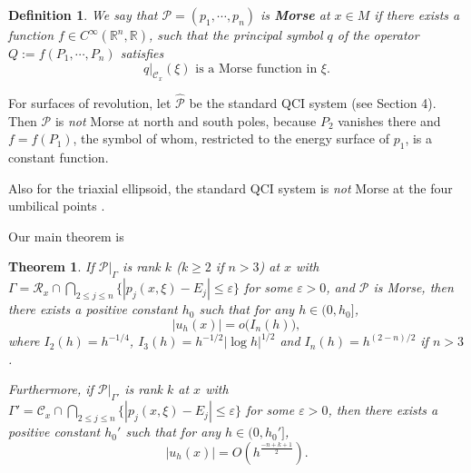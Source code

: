 \documentclass[12pt,reqno]{amsart}
\renewcommand{\epsilon}{\varepsilon}
\newcommand{\R}{{\mathbb R}}
\newcommand{\ep}{\varepsilon}
\newtheorem{maintheo}{{\sc Theorem}}
\numberwithin{equation}{section}
\newenvironment{rem}{\medskip\noindent{\it Remark:\/} }{\medskip}
\newtheorem{defn}[theo]{{\sc Definition}}
\begin{document}
\begin{defn}\label{morse}
    We say that $\mathcal{P}=(p_1,\cdots,p_n)$ is {\bf Morse} at $x\in M$ if there exists a function $f\in C^{\infty}(\R^n,\R)$, such that the principal symbol $q$ of the operator $Q:=f(P_1,\cdots,P_n)$ satisfies 
    \begin{equation}
        q\big|_{\mathcal{C}_x}(\xi) \text{ is a Morse function in } \xi. 
    \end{equation}
\end{defn}

\begin{rem}
    For surfaces of revolution, let $\hat{\mathcal{P}}$ be the standard QCI system (see Section 4). Then $\mathcal{P}$ is \textit{not} Morse at north and south poles, because $P_2$ vanishes there and $f=f(P_1)$, the symbol of whom, restricted to the energy surface of $p_1$, is a constant function.
    
    Also for the triaxial ellipsoid, the standard QCI system is \textit{not} Morse at the four umbilical points \cite{GT2020}. 
\end{rem}

Our main theorem is 

\begin{maintheo}\label{main1}
If $\mathcal{P}|_{\Gamma}$ is rank $k$ \rm{($k\geq 2$ if $n>3$)} at $x$ with $\Gamma=\mathcal{R}_x\cap \bigcap\limits_{2\leq j \leq n}\{|p_j(x,\xi)-E_j|\leq \epsilon\} $ for some $\ep>0$, and $\mathcal{P}$ is Morse, then there exists a positive constant $h_0$ such that for any $h\in (0, h_0]$,
\begin{equation}\label{main1 eq}
| u_h(x) |  = o\big(I_n(h)\big),
\end{equation}
where $I_2(h)=h^{-1/4}$, $I_3(h)=h^{-1/2}|\log h|^{1/2}$ and $I_n(h)=h^{(2-n)/2}$ if $n>3$. 

Furthermore, if $\mathcal{P}|_{\Gamma'}$ is rank $k$ at $x$ with $\Gamma'=\mathcal{C}_x\cap \bigcap\limits_{2\leq j \leq n}\{|p_j(x,\xi)-E_j|\leq \epsilon\}$ for some $\ep>0$, then there exists a positive constant $h_0'$ such that for any $h\in (0, h_0']$,
\begin{equation}\label{main1 eq2}
| u_h(x) | = O(h^{\frac{-n+k+1}2}).
\end{equation}

\end{maintheo}
\end{document}
